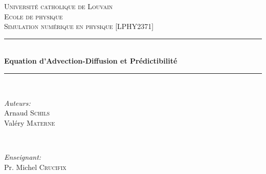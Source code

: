 \documentclass[a4paper, 12pt]{report}
\begin{document}
\begin{titlepage}

\newcommand{\HRule}{\rule{\linewidth}{0.5mm}} %

\center %


\textsc{\LARGE Université catholique de Louvain}\\[0.5cm] %
\textsc{\Large Ecole de physique}\\[1.5cm] %
\textsc{\Large Simulation numérique en physique [\textsc{\normalsize LPHY2371}]}\\[0.5cm]


\HRule \\[0.4cm]
{ \huge \bfseries Equation d'Advection-Diffusion et Prédictibilité}\\[0.4cm] %
\HRule \\[1.5cm]


\begin{minipage}[t]{0.6\textwidth}
\begin{flushleft} \large
\begin{tabbing}
\emph{Auteurs:}\\
Arnaud \hspace{0.1cm}\= \textsc{Schils}\\ %
Valéry \> \textsc{Materne}
\end{tabbing}
\end{flushleft}
\end{minipage}
~
\begin{minipage}[t]{0.6\textwidth}
\begin{flushright} \large
\emph{Enseignant:} \\
Pr. Michel \textsc{Crucifix} %
\end{flushright}
\end{minipage}\\[1.5cm]


\end{titlepage}
\end{document}
